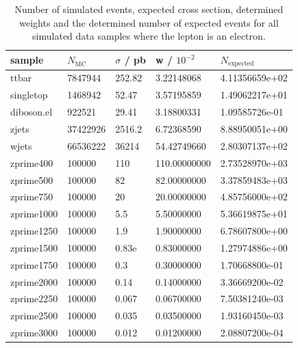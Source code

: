 \begin{table}[H]
  \centering
  \begin{tabular}{l|llll}
      sample           &  $N_\text{MC}$  & $\sigma$ / pb & w / $10^{-2}$& $N_\text{expected}$ \\
      \hline
      ttbar      & 7847944    & 252.82    &    3.22148068   &     4.11356659e+02       \\
      singletop  & 1468942    & 52.47     &    3.57195859   &     1.49062217e+01       \\
      diboson.el & 922521     & 29.41     &    3.18800331   &     1.09585726e-01       \\
      zjets      & 37422926   & 2516.2    &    6.72368590   &     8.88950051e+00       \\
      wjets      & 66536222   & 36214     &   54.42749660   &     2.80307137e+02       \\
      zprime400  & 100000     & 110       &  110.00000000   &     2.73528970e+03       \\
      zprime500  & 100000     & 82        &   82.00000000   &     3.37859483e+03       \\
      zprime750  & 100000     & 20        &   20.00000000   &     4.85756000e+02       \\
      zprime1000 & 100000     & 5.5       &    5.50000000   &     5.36619875e+01       \\
      zprime1250 & 100000     & 1.9       &    1.90000000   &     6.78607800e+00       \\
      zprime1500 & 100000     & 0.83e     &    0.83000000   &     1.27974886e+00       \\
      zprime1750 & 100000     & 0.3       &    0.30000000   &     1.70668800e-01       \\
      zprime2000 & 100000     & 0.14      &    0.14000000   &     3.36669200e-02       \\
      zprime2250 & 100000     & 0.067     &    0.06700000   &     7.50381240e-03       \\
      zprime2500 & 100000     & 0.035     &    0.03500000   &     1.93160450e-03       \\
      zprime3000 & 100000     & 0.012     &    0.01200000   &     2.08807200e-04       \\
      \end{tabular}
\caption{Number of simulated events, expected cross section, determined weights and the determined number of expected events for all simulated 
data samples where the lepton is an electron.}
\label{tab:agree}

  \end{table}

